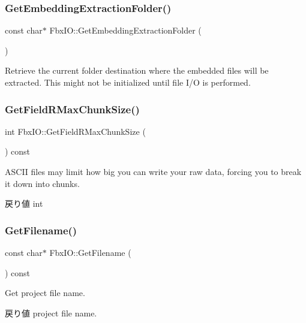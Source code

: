 \subsubsection{\texorpdfstring{Get\+Embedding\+Extraction\+Folder()}{GetEmbeddingExtractionFolder()}}
{\footnotesize\ttfamily const char$\ast$ Fbx\+I\+O\+::\+Get\+Embedding\+Extraction\+Folder (\begin{DoxyParamCaption}{ }\end{DoxyParamCaption})}

Retrieve the current folder destination where the embedded files will be extracted. This might not be initialized until file I/O is performed. \mbox{\label{class_fbx_i_o_a31fd3de545578822a1f85ee1678a2511}} 
\subsubsection{\texorpdfstring{Get\+Field\+R\+Max\+Chunk\+Size()}{GetFieldRMaxChunkSize()}}
{\footnotesize\ttfamily int Fbx\+I\+O\+::\+Get\+Field\+R\+Max\+Chunk\+Size (\begin{DoxyParamCaption}{ }\end{DoxyParamCaption}) const}

A\+S\+C\+II files may limit how big you can write your raw data, forcing you to break it down into chunks. \begin{DoxyReturn}{戻り値}
int 
\end{DoxyReturn}
\mbox{\label{class_fbx_i_o_a634cd1b2c4538395554b69843335dbf4}} 
\subsubsection{\texorpdfstring{Get\+Filename()}{GetFilename()}}
{\footnotesize\ttfamily const char$\ast$ Fbx\+I\+O\+::\+Get\+Filename (\begin{DoxyParamCaption}{ }\end{DoxyParamCaption}) const}

Get project file name. \begin{DoxyReturn}{戻り値}
project file name. 
\end{DoxyReturn}
\mbox{\label{class_fbx_i_o_a4a42a8eab3c6d947fabc1a3625f3548d}} 
